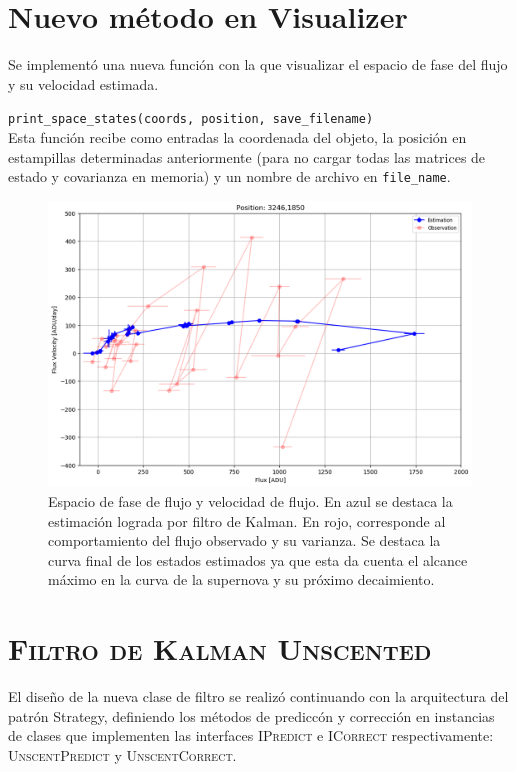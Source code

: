 \section{Nuevo m\'etodo en Visualizer}

Se implement\'o una nueva funci\'on con la que visualizar el espacio de fase del flujo y su velocidad estimada.

\texttt{print\_space\_states(coords, position, save\_filename)}\\

Esta funci\'on recibe como entradas la coordenada del objeto, la posici\'on en estampillas determinadas anteriormente (para no cargar todas las matrices de estado y covarianza en memoria) y un nombre de archivo en \texttt{file\_name}.

\begin{figure}
\includegraphics[scale=.5]{images/space_curve.png}
\caption{Espacio de fase de flujo y velocidad de flujo. En azul se destaca la estimaci\'on lograda por filtro de Kalman. En rojo, corresponde al comportamiento del flujo observado y su varianza. Se destaca la curva final de los estados estimados ya que esta da cuenta el alcance m\'aximo en la curva de la supernova y su pr\'oximo decaimiento.}
\end{figure}
\section{\textsc{Filtro de Kalman Unscented}}
El dise\~no de la nueva clase de filtro se realiz\'o continuando con la arquitectura del patr\'on Strategy, definiendo los m\'etodos de predicc\'on y correcci\'on en instancias de clases que implementen las interfaces \textsc{IPredict} e \textsc{ICorrect} respectivamente: \textsc{UnscentPredict} y \textsc{UnscentCorrect}.

